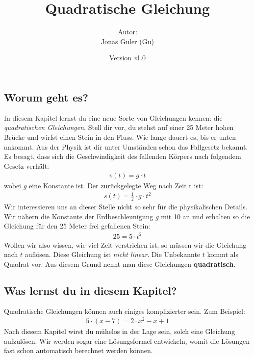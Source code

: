 \documentclass[11pt,oneside]{article}
\newcommand{\Skriptname}{Quadratische Gleichung}
\newcommand{\Autor}{Jonas Guler (Gu)}
\newcommand{\version}{\textit{v}1.0}
\begin{document}
\begin{titlepage}
	\clearpage
	\title{\Huge\textbf{\Skriptname} \\[1cm]}
	\author{Autor:\\ \Autor}
	\date{\normalsize {Version \version}\\ \datelong}
	\maketitle
	\thispagestyle{empty}
	\vfill
	\tableofcontents
\end{titlepage}
\subsection*{Worum geht es?}
	In diesem Kapitel lernst du eine neue Sorte von Gleichungen kennen: die \textit{quadratischen Gleichungen}.
	Stell dir vor, du stehst auf einer 25 Meter hohen Brücke und wirfst einen Stein in den Fluss. Wie lange dauert es, bis er unten ankommt. Aus der Physik ist dir unter Umständen schon das Fallgesetz bekannt. Es besagt, dass sich die Geschwindigkeit des fallenden Körpers nach folgendem Gesetz verhält:
	\begin{align*}
		v(t)=g\cdot t
	\end{align*}
	wobei $g$ eine Konstante ist. Der zurückgelegte Weg nach Zeit t ist:
	\begin{align*}
		s(t)=\frac{1}{2}\cdot g\cdot t^2
	\end{align*}
	Wir interessieren uns an dieser Stelle nicht so sehr für die physikalischen Details. Wir nähern die Konstante der Erdbeschleunigung $g$ mit 10 an und erhalten so die Gleichung für den 25 Meter frei gefallenen Stein:
	\begin{align*}
		25=5\cdot t^2
	\end{align*}
	Wollen wir also wissen, wie viel Zeit verstrichen ist, so müssen wir die Gleichung nach $t$ auflösen.
	Diese Gleichung ist \emph{nicht linear}. Die Unbekannte $t$ kommt als Quadrat vor. Aus diesem Grund nennt man diese Gleichungen \textbf{quadratisch}.
\subsection*{Was lernst du in diesem Kapitel?}
	Quadratische Gleichungen können auch einiges komplizierter sein. Zum Beispiel:
	\begin{align*}
		5\cdot (x-7)=2\cdot x^2 -x +1
	\end{align*}
	Nach diesem Kapitel wirst du mühelos in der Lage sein, solch eine Gleichung aufzulösen. Wir werden sogar eine Lösungsformel entwickeln, womit die Lösungen fast schon automatisch berechnet werden können.
\end{document}
